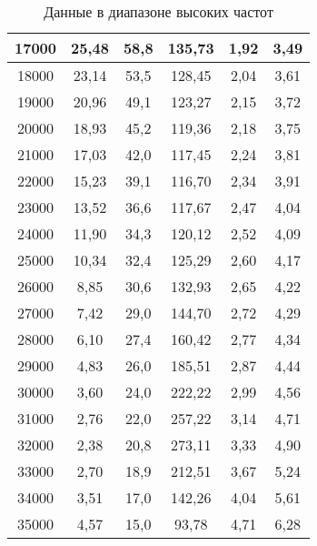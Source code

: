 \begin{table}[h!]
\begin{tabular}{|c|c|c|c|c|c|}
    17000   & 25,48    & 58,8      & 135,73                    & 1,92             & 3,49          \\ \hline
    18000   & 23,14    & 53,5      & 128,45                    & 2,04             & 3,61          \\ \hline
    19000   & 20,96    & 49,1      & 123,27                    & 2,15             & 3,72          \\ \hline
    20000   & 18,93    & 45,2      & 119,36                    & 2,18             & 3,75          \\ \hline
    21000   & 17,03    & 42,0      & 117,45                    & 2,24             & 3,81          \\ \hline
    22000   & 15,23    & 39,1      & 116,70                    & 2,34             & 3,91          \\ \hline
    23000   & 13,52    & 36,6      & 117,67                    & 2,47             & 4,04          \\ \hline
    24000   & 11,90    & 34,3      & 120,12                    & 2,52             & 4,09          \\ \hline
    25000   & 10,34    & 32,4      & 125,29                    & 2,60             & 4,17          \\ \hline
    26000   & 8,85     & 30,6      & 132,93                    & 2,65             & 4,22          \\ \hline
    27000   & 7,42     & 29,0      & 144,70                    & 2,72             & 4,29          \\ \hline
    28000   & 6,10     & 27,4      & 160,42                    & 2,77             & 4,34          \\ \hline
    29000   & 4,83     & 26,0      & 185,51                    & 2,87             & 4,44          \\ \hline
    30000   & 3,60     & 24,0      & 222,22                    & 2,99             & 4,56          \\ \hline
    31000   & 2,76     & 22,0      & 257,22                    & 3,14             & 4,71          \\ \hline
    32000   & 2,38     & 20,8      & 273,11                    & 3,33             & 4,90          \\ \hline
    33000   & 2,70     & 18,9      & 212,51                    & 3,67             & 5,24          \\ \hline
    34000   & 3,51     & 17,0      & 142,26                    & 4,04             & 5,61          \\ \hline
    35000   & 4,57     & 15,0      & 93,78                     & 4,71             & 6,28          \\ \hline
    \end{tabular}
    \caption{Данные в диапазоне высоких частот}
    \label{table_hight_f}
\end{table}